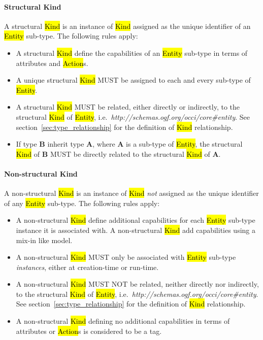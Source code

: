 \documentclass[10pt,a4paper,british]{article}
\begin{document}
\paragraph*{Structural Kind}
A structural \hl{Kind} is an instance of \hl{Kind} assigned as the unique
identifier of an \hl{Entity} sub-type. The following rules apply:
\begin{itemize}
\item A structural \hl{Kind} define the capabilities of an \hl{Entity} sub-type in terms of attributes and \hl{Action}s.
\item A unique structural \hl{Kind} MUST be assigned to each and every sub-type
 of \hl{Entity}.
\item A structural \hl{Kind} MUST be related, either directly or indirectly, to
 the structural \hl{Kind} of \hl{Entity},
 i.e.~\textit{http://schemas.ogf.org/occi/core\#entity}.
 See section~\ref{sec:type_relationship} for the definition of \hl{Kind}
 relationship.
\item If type {\bf B} inherit type {\bf A}, where {\bf A} is a sub-type of
 \hl{Entity}, the structural \hl{Kind} of {\bf B} MUST be directly related to the
 structural \hl{Kind} of {\bf A}.
\end{itemize}

\paragraph*{Non-structural Kind} A non-structural \hl{Kind} is an instance of
\hl{Kind} {\em not} assigned as the unique identifier of any \hl{Entity} sub-type.
The following rules apply:
\begin{itemize}
\item A non-structural \hl{Kind} define additional capabilities for each
 \hl{Entity} sub-type instance it is associated with. A non-structural \hl{Kind}
 add capabilities using a mix-in like model.
\item A non-structural \hl{Kind} MUST only be associated with \hl{Entity}
 sub-type {\em instances}, either at creation-time or run-time.
\item A non-structural \hl{Kind} MUST NOT be related, neither directly nor
 indirectly, to the structural \hl{Kind} of \hl{Entity},
 i.e.~\textit{http://schemas.ogf.org/occi/core\#entity}.
 See section~\ref{sec:type_relationship} for the definition of \hl{Kind}
 relationship.
\item A non-structural \hl{Kind} defining no additional capabilities in terms
 of attributes or \hl{Action}s is considered to be a tag.
\end{itemize}
\end{document}
